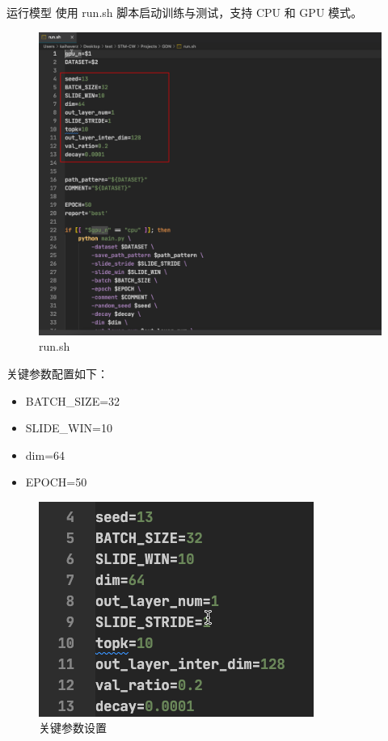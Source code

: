 \documentclass[hyperref,a4paper,UTF8]{ctexart}
\begin{document}
运行模型
使用 run.sh 脚本启动训练与测试，支持 CPU 和 GPU 模式。
\begin{figure}[H]
    \centering
    \includegraphics[width=0.75\linewidth]{复现/run.png}
    \caption{run.sh}
    \label{fig:enter-label}
\end{figure}
关键参数配置如下：
\begin{itemize}
    \item BATCH\_SIZE=32
    \item SLIDE\_WIN=10
    \item dim=64
    \item EPOCH=50
\end{itemize}
\begin{figure}[H]
    \centering
    \includegraphics[width=0.75\linewidth]{复现/关键参数.png}
    \caption{关键参数设置}
    \label{fig:enter-label}
\end{figure}
\end{document}

